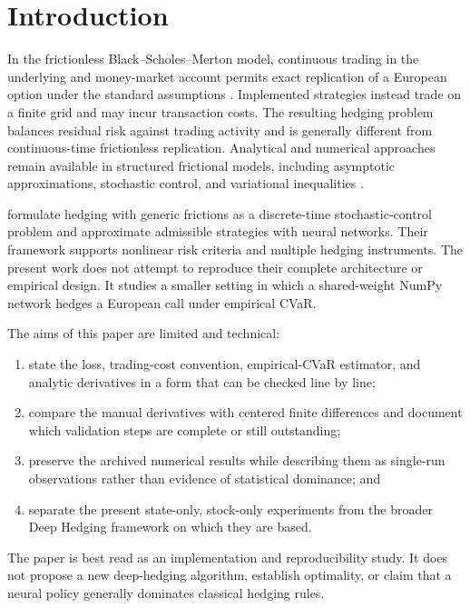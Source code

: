 \section{Introduction}

In the frictionless Black--Scholes--Merton model, continuous trading in the
underlying and money-market account permits exact replication of a European
option under the standard assumptions \citep{blackscholes1973,merton1973}.
Implemented strategies instead trade on a finite grid and may incur transaction
costs. The resulting hedging problem balances residual risk against trading
activity and is generally different from continuous-time frictionless
replication. Analytical and numerical approaches remain available in structured
frictional models, including asymptotic approximations, stochastic control, and
variational inequalities
\citep{leland1985,hoggardwhalleywilmott1994,whalleywilmott1997}.

\citet{buehler2019} formulate hedging with generic frictions as a discrete-time
stochastic-control problem and approximate admissible strategies with neural
networks. Their framework supports nonlinear risk criteria and multiple hedging
instruments. The present work does not attempt to reproduce their complete
architecture or empirical design. It studies a smaller setting in which a
shared-weight NumPy network hedges a European call under empirical CVaR.

The aims of this paper are limited and technical:

\begin{enumerate}[leftmargin=2em]
  \item state the loss, trading-cost convention, empirical-CVaR estimator, and
  analytic derivatives in a form that can be checked line by line;
  \item compare the manual derivatives with centered finite differences and
  document which validation steps are complete or still outstanding;
  \item preserve the archived numerical results while describing them as
  single-run observations rather than evidence of statistical dominance; and
  \item separate the present state-only, stock-only experiments from the
  broader Deep Hedging framework on which they are based.
\end{enumerate}

The paper is best read as an implementation and reproducibility study. It does
not propose a new deep-hedging algorithm, establish optimality, or claim that a
neural policy generally dominates classical hedging rules.

